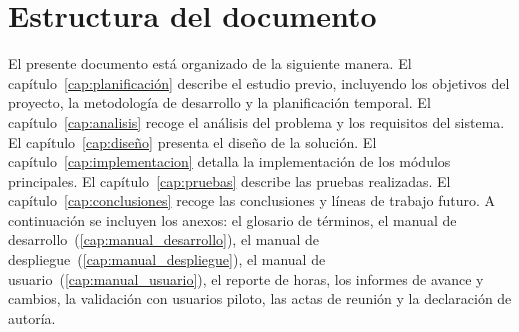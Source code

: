 \section{Estructura del documento}

El presente documento está organizado de la siguiente manera. El capítulo~\ref{cap:planificación} describe el estudio previo, incluyendo los objetivos del proyecto, la metodología de desarrollo y la planificación temporal. El capítulo~\ref{cap:analisis} recoge el análisis del problema y los requisitos del sistema. El capítulo~\ref{cap:diseño} presenta el diseño de la solución. El capítulo~\ref{cap:implementacion} detalla la implementación de los módulos principales. El capítulo~\ref{cap:pruebas} describe las pruebas realizadas. El capítulo~\ref{cap:conclusiones} recoge las conclusiones y líneas de trabajo futuro. A continuación se incluyen los anexos: el glosario de términos, el manual de desarrollo~(\ref{cap:manual_desarrollo}), el manual de despliegue~(\ref{cap:manual_despliegue}), el manual de usuario~(\ref{cap:manual_usuario}), el reporte de horas, los informes de avance y cambios, la validación con usuarios piloto, las actas de reunión y la declaración de autoría.
